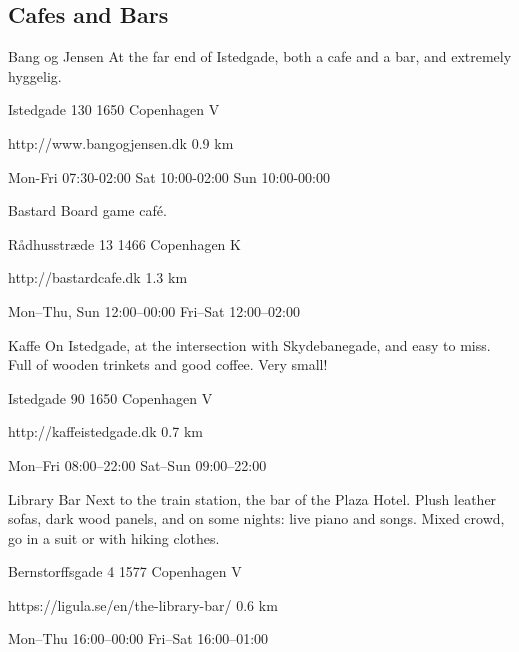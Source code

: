 \begin{left}
\begin{eventitem}
\begin{eventitem}
\begin{eventitem}
\section{Cafes and Bars}

\begin{fooditem}
{Bang og Jensen}
{At the far end of Istedgade, both a cafe and a bar, and extremely hyggelig.}
{\begin{addr}
{Istedgade 130}
{1650 Copenhagen V}
\end{addr}}
{http://www.bangogjensen.dk}
{0.9 km}
{}
{\begin{ohours}
{Mon-Fri}
{07:30-02:00}
{Sat}
{10:00-02:00}
{Sun}
{10:00-00:00}
{}
{}
\end{ohours}}
\end{fooditem}
\begin{fooditem}
{Bastard}
{Board game café.}
{\begin{addr}
{Rådhusstræde 13}
{1466 Copenhagen K}
\end{addr}}
{http://bastardcafe.dk }
{1.3 km}
{}
{\begin{ohours}
{Mon–Thu, Sun}
{12:00–00:00}
{Fri–Sat}
{12:00–02:00}
{}
{}
{}
{}
\end{ohours}}
\end{fooditem}
\begin{fooditem}
{Kaffe}
{On Istedgade, at the intersection with Skydebanegade, and easy to miss. Full of wooden trinkets and good coffee. Very small!}
{\begin{addr}
{Istedgade 90}
{1650 Copenhagen V}
\end{addr}}
{http://kaffeistedgade.dk}
{0.7 km}
{}
{\begin{ohours}
{Mon–Fri}
{08:00–22:00}
{Sat–Sun}
{09:00–22:00}
{}
{}
{}
{}
\end{ohours}}
\end{fooditem}
\begin{fooditem}
{Library Bar}
{Next to the train station, the bar of the Plaza Hotel. Plush leather sofas, dark wood panels, and on some nights: live piano and songs. Mixed crowd, go in a suit or with hiking clothes.}
{\begin{addr}
{Bernstorffsgade 4}
{1577 Copenhagen V}
\end{addr}}
{https://ligula.se/en/the-library-bar/}
{0.6 km}
{}
{\begin{ohours}
{Mon–Thu}
{16:00–00:00}
{Fri–Sat}
{16:00–01:00}
{}
{}
{}
{}
\end{ohours}}
\end{fooditem}
\begin{fooditem}

\end{fooditem}
\end{eventitem}
\end{eventitem}
\end{eventitem}
\end{left}
